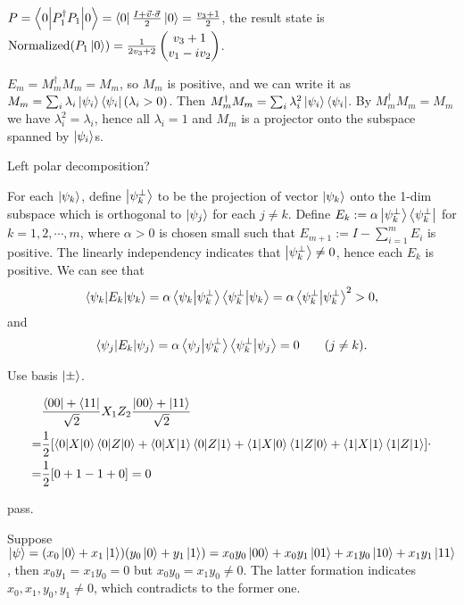 \ex $P=\left\langle0\middle|P_1^\dagger P_1\middle|0\right\rangle=\left\langle0\right|\frac{I+\vec{v}\cdot\vec{\sigma}}{2}\left|0\right\rangle=\frac{v_3+1}{2}$, the result state is $\operatorname{Normalized}(P_1\left|0\right\rangle)=\frac{1}{2v_3+2}\begin{pmatrix}
    v_3+1\\v_1-iv_2
\end{pmatrix}$.

\ex $E_m=M_m^\dagger M_m=M_m$, so $M_m$ is positive, and we can write it as $M_m=\sum_i\lambda_i\left|\psi_i\right\rangle\left\langle\psi_i\right|(\lambda_i>0)$.
Then $M_m^\dagger M_m=\sum_i\lambda_i^2\left|\psi_i\right\rangle\left\langle\psi_i\right|$.
By $M_m^\dagger M_m=M_m$ we have $\lambda_i^2=\lambda_i$, hence all $\lambda_i=1$ and $M_m$ is a projector onto the subspace spanned by $\left|\psi_i\right\rangle$s.

\ex Left polar decomposition?

\ex For each $\left|\psi_k\right\rangle$, define $\left|\psi_k^\perp\right\rangle$ to be the projection of vector $\left|\psi_k\right\rangle$ onto the 1-dim subspace which is orthogonal to $\left|\psi_j\right\rangle$ for each $j\neq k$.
Define $E_k := \alpha\left|\psi_k^\perp\right\rangle\left\langle\psi_k^\perp\right|$ for $k=1,2,\cdots,m$, where $\alpha>0$ is chosen small such that $E_{m+1} := I-\sum_{i=1}^mE_i$ is positive.
The linearly independency indicates that $\left|\psi_k^\perp\right\rangle\neq 0$, hence each $E_k$ is positive.
We can see that
$$
    \left\langle\psi_k\middle|E_k\middle|\psi_k\right\rangle = \alpha\left\langle\psi_k\middle|\psi_k^\perp\right\rangle\left\langle\psi_k^\perp\middle|\psi_k\right\rangle = \alpha\left\langle\psi_k^\perp\middle|\psi_k^\perp\right\rangle^2 > 0,
$$
and
$$
    \left\langle\psi_j\middle|E_k\middle|\psi_j\right\rangle = \alpha\left\langle\psi_j\middle|\psi_k^\perp\right\rangle\left\langle\psi_k^\perp\middle|\psi_j\right\rangle = 0\qquad(j\neq k).
$$

\ex Use basis $\left|\pm\right\rangle$.

\ex 
$$\begin{aligned}
    &\frac{\left\langle00\right|+\left\langle11\right|}{\sqrt{2}}X_1Z_2\frac{\left|00\right\rangle+\left|11\right\rangle}{\sqrt{2}}
    \\=&\frac{1}{2}[\left\langle0\middle|X\middle|0\right\rangle\left\langle0\middle|Z\middle|0\right\rangle+\left\langle0\middle|X\middle|1\right\rangle\left\langle0\middle|Z\middle|1\right\rangle+\left\langle1\middle|X\middle|0\right\rangle\left\langle1\middle|Z\middle|0\right\rangle+\left\langle1\middle|X\middle|1\right\rangle\left\langle1\middle|Z\middle|1\right\rangle]
    \\=&\frac{1}{2}[0+1-1+0]=0
\end{aligned}.$$

\ex pass.

\ex Suppose $\left|\psi\right\rangle=(x_0\left|0\right\rangle+x_1\left|1\right\rangle)(y_0\left|0\right\rangle+y_1\left|1\right\rangle)=x_0y_0\left|00\right\rangle+x_0y_1\left|01\right\rangle+x_1y_0\left|10\right\rangle+x_1y_1\left|11\right\rangle$, then $x_0y_1=x_1y_0=0$ but $x_0y_0=x_1y_0\neq 0$. The latter formation indicates $x_0,x_1,y_0,y_1\neq 0$, which contradicts to the former one.
